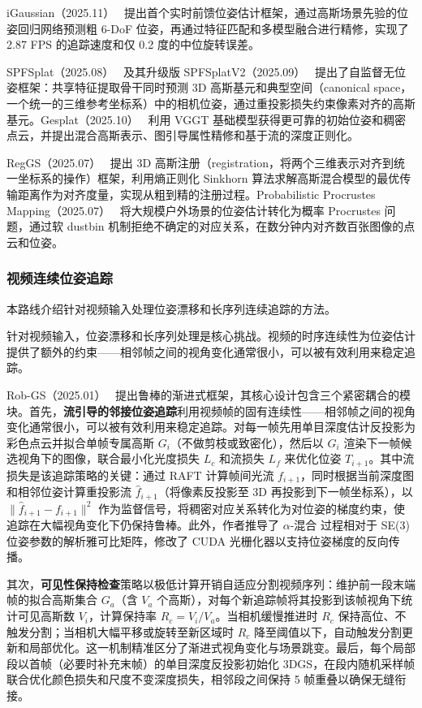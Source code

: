 iGaussian（2025.11）~\cite{2511_14149} 提出首个实时前馈位姿估计框架，通过高斯场景先验的位姿回归网络预测粗 6-DoF 位姿，再通过特征匹配和多模型融合进行精修，实现了 2.87 FPS 的追踪速度和仅 0.2 度的中位旋转误差。

SPFSplat（2025.08）~\cite{2508_01171} 及其升级版 SPFSplatV2（2025.09）~\cite{2509_17246} 提出了自监督无位姿框架：共享特征提取骨干同时预测 3D 高斯基元和典型空间（canonical space，一个统一的三维参考坐标系）中的相机位姿，通过重投影损失约束像素对齐的高斯基元。Gesplat（2025.10）~\cite{2510_10097} 利用 VGGT 基础模型获得更可靠的初始位姿和稠密点云，并提出混合高斯表示、图引导属性精修和基于流的深度正则化。

RegGS（2025.07）~\cite{2507_08136} 提出 3D 高斯注册（registration，将两个三维表示对齐到统一坐标系的操作）框架，利用熵正则化 Sinkhorn 算法求解高斯混合模型的最优传输距离作为对齐度量，实现从粗到精的注册过程。Probabilistic Procrustes Mapping（2025.07）~\cite{2507_18541} 将大规模户外场景的位姿估计转化为概率 Procrustes 问题，通过软 dustbin 机制拒绝不确定的对应关系，在数分钟内对齐数百张图像的点云和位姿。

\subsubsection{视频连续位姿追踪}

本路线介绍针对视频输入处理位姿漂移和长序列连续追踪的方法。

针对视频输入，位姿漂移和长序列处理是核心挑战。视频的时序连续性为位姿估计提供了额外的约束——相邻帧之间的视角变化通常很小，可以被有效利用来稳定追踪。

Rob-GS（2025.01）~\cite{2501_15096} 提出鲁棒的渐进式框架，其核心设计包含三个紧密耦合的模块。首先，\textbf{流引导的邻接位姿追踪}利用视频帧的固有连续性——相邻帧之间的视角变化通常很小，可以被有效利用来稳定追踪。对每一帧先用单目深度估计反投影为彩色点云并拟合单帧专属高斯 $G_i$（不做剪枝或致密化），然后以 $G_i$ 渲染下一帧候选视角下的图像，联合最小化光度损失 $L_c$ 和流损失 $L_f$ 来优化位姿 $T_{i+1}$。其中流损失是该追踪策略的关键：通过 RAFT 计算帧间光流 $f_{i+1}$，同时根据当前深度图和相邻位姿计算重投影流 $\hat{f}_{i+1}$（将像素反投影至 3D 再投影到下一帧坐标系），以 $\|\hat{f}_{i+1} - f_{i+1}\|^2$ 作为监督信号，将稠密对应关系转化为对位姿的梯度约束，使追踪在大幅视角变化下仍保持鲁棒。此外，作者推导了 $\alpha$-混合 过程相对于 SE(3) 位姿参数的解析雅可比矩阵，修改了 CUDA 光栅化器以支持位姿梯度的反向传播。

其次，\textbf{可见性保持检查}策略以极低计算开销自适应分割视频序列：维护前一段末端帧的拟合高斯集合 $G_a$（含 $V_a$ 个高斯），对每个新追踪帧将其投影到该帧视角下统计可见高斯数 $V_i$，计算保持率 $R_c = V_i / V_a$。当相机缓慢推进时 $R_c$ 保持高位、不触发分割；当相机大幅平移或旋转至新区域时 $R_c$ 降至阈值以下，自动触发分割更新和局部优化。这一机制精准区分了渐进式视角变化与场景跳变。最后，每个局部段以首帧（必要时补充末帧）的单目深度反投影初始化 3DGS，在段内随机采样帧联合优化颜色损失和尺度不变深度损失，相邻段之间保持 5 帧重叠以确保无缝衔接。

